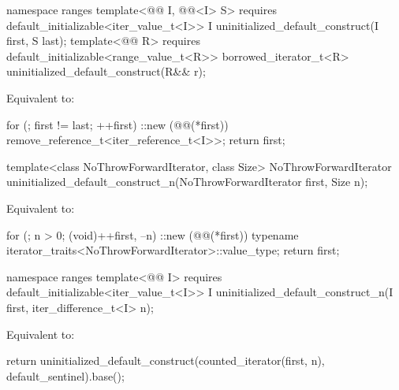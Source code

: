 %
\begin{itemdecl}
namespace ranges {
  template<@@ I, @@<I> S>
      requires default_initializable<iter_value_t<I>>
    I uninitialized_default_construct(I first, S last);
  template<@@ R>
      requires default_initializable<range_value_t<R>>
    borrowed_iterator_t<R> uninitialized_default_construct(R&& r);
}
\end{itemdecl}

\begin{itemdescr}
\pnum
\effects
Equivalent to:
\begin{codeblock}
for (; first != last; ++first)
  ::new (@@(*first)) remove_reference_t<iter_reference_t<I>>;
return first;
\end{codeblock}
\end{itemdescr}

%
\begin{itemdecl}
template<class NoThrowForwardIterator, class Size>
  NoThrowForwardIterator uninitialized_default_construct_n(NoThrowForwardIterator first, Size n);
\end{itemdecl}

\begin{itemdescr}
\pnum
\effects
Equivalent to:
\begin{codeblock}
for (; n > 0; (void)++first, --n)
  ::new (@@(*first))
    typename iterator_traits<NoThrowForwardIterator>::value_type;
return first;
\end{codeblock}
\end{itemdescr}

%
\begin{itemdecl}
namespace ranges {
  template<@@ I>
      requires default_initializable<iter_value_t<I>>
    I uninitialized_default_construct_n(I first, iter_difference_t<I> n);
}
\end{itemdecl}

\begin{itemdescr}
\pnum
\effects
Equivalent to:
\begin{codeblock}
return uninitialized_default_construct(counted_iterator(first, n),
                                       default_sentinel).base();
\end{codeblock}
\end{itemdescr}

